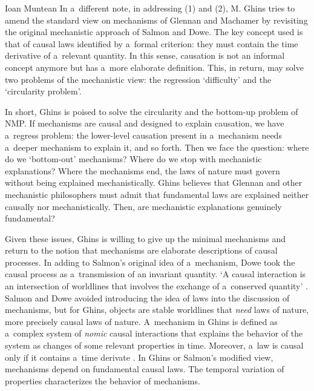 \begin{recengenv}{Ioan Muntean}
In a~different note, in addressing (1) and (2), M. Ghins tries to amend the standard view on mechanisms of Glennan and Machamer by revisiting the original mechanistic approach of Salmon and Dowe. The key concept used is that of causal laws identified by a~formal criterion: they must contain the time derivative of a~relevant quantity. In this sense, causation is not an informal concept anymore but has a~more elaborate definition. This, in return, may solve two problems of the mechanistic view: the regression ‘difficulty' and the ‘circularity problem'.

In short, Ghins is poised to solve the circularity and the bottom-up problem of NMP. If mechanisms are causal and designed to explain causation, we have a~regress problem: the lower-level causation present in a~mechanism needs a~deeper mechanism to explain it, and so forth. Then we face the question: where do we ‘bottom-out' mechanisms? Where do we stop with mechanistic explanations?
\parencite*[][p.99]{falkenburg_mechanistic_2019} %
 Where the mechanisms end, the laws of nature must govern without being explained mechanistically. Ghins believes that Glennan and other mechanistic philosophers must admit that fundamental laws are explained  neither  causally nor  mechanistically. Then, are mechanistic explanations genuinely fundamental?

Given these issues, Ghins is willing to give up the minimal mechanisms and return to the notion that mechanisms are elaborate descriptions of causal processes. In adding to Salmon's original idea of a~mechanism, Dowe took the causal process as a~transmission of an invariant quantity. ‘A causal interaction is an intersection of worldlines that involves the exchange of a~conserved quantity'
\parencite*[][p.103]{falkenburg_mechanistic_2019}. %
 Salmon and Dowe avoided introducing the idea of laws into the discussion of mechanisms, but for Ghins, objects are stable worldlines that \textit{need} laws of nature, more precisely causal laws of nature. A~mechanism in Ghins is defined as a~complex system of \textit{nomic} causal interactions that explains the behavior of the system as changes of some relevant properties in time. Moreover, a~law is causal only if it contains a~time derivate 
\parencite*[][p.106]{falkenburg_mechanistic_2019}. %
 In Ghins or Salmon's modified view, mechanisms depend on fundamental causal laws. The temporal variation of properties characterizes the behavior of mechanisms.


\end{recengenv}

